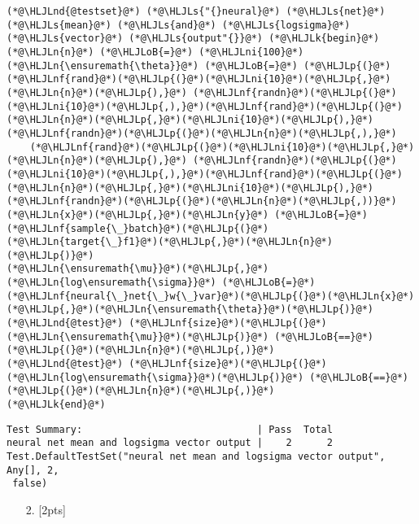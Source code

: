 \documentclass[12pt,a4paper]{article}
\newcommand{\HLJLk}[1]{\textcolor[RGB]{148,91,176}{\textbf{#1}}}
\newcommand{\HLJLn}[1]{#1}
\newcommand{\HLJLnd}[1]{\textcolor[RGB]{214,102,97}{#1}}
\newcommand{\HLJLnf}[1]{\textcolor[RGB]{66,102,213}{#1}}
\newcommand{\HLJLs}[1]{\textcolor[RGB]{201,61,57}{#1}}
\newcommand{\HLJLni}[1]{\textcolor[RGB]{59,151,46}{#1}}
\newcommand{\HLJLoB}[1]{\textcolor[RGB]{102,102,102}{\textbf{#1}}}
\newcommand{\HLJLp}[1]{#1}
\begin{document}
\begin{lstlisting}
(*@\HLJLnd{@testset}@*) (*@\HLJLs{"{}neural}@*) (*@\HLJLs{net}@*) (*@\HLJLs{mean}@*) (*@\HLJLs{and}@*) (*@\HLJLs{logsigma}@*) (*@\HLJLs{vector}@*) (*@\HLJLs{output"{}}@*) (*@\HLJLk{begin}@*)
(*@\HLJLn{n}@*) (*@\HLJLoB{=}@*) (*@\HLJLni{100}@*)
(*@\HLJLn{\ensuremath{\theta}}@*) (*@\HLJLoB{=}@*) (*@\HLJLp{(}@*)(*@\HLJLnf{rand}@*)(*@\HLJLp{(}@*)(*@\HLJLni{10}@*)(*@\HLJLp{,}@*)(*@\HLJLn{n}@*)(*@\HLJLp{),}@*) (*@\HLJLnf{randn}@*)(*@\HLJLp{(}@*)(*@\HLJLni{10}@*)(*@\HLJLp{,),}@*)(*@\HLJLnf{rand}@*)(*@\HLJLp{(}@*)(*@\HLJLn{n}@*)(*@\HLJLp{,}@*)(*@\HLJLni{10}@*)(*@\HLJLp{),}@*)(*@\HLJLnf{randn}@*)(*@\HLJLp{(}@*)(*@\HLJLn{n}@*)(*@\HLJLp{,),}@*)
    (*@\HLJLnf{rand}@*)(*@\HLJLp{(}@*)(*@\HLJLni{10}@*)(*@\HLJLp{,}@*)(*@\HLJLn{n}@*)(*@\HLJLp{),}@*) (*@\HLJLnf{randn}@*)(*@\HLJLp{(}@*)(*@\HLJLni{10}@*)(*@\HLJLp{,),}@*)(*@\HLJLnf{rand}@*)(*@\HLJLp{(}@*)(*@\HLJLn{n}@*)(*@\HLJLp{,}@*)(*@\HLJLni{10}@*)(*@\HLJLp{),}@*)(*@\HLJLnf{randn}@*)(*@\HLJLp{(}@*)(*@\HLJLn{n}@*)(*@\HLJLp{,))}@*)
(*@\HLJLn{x}@*)(*@\HLJLp{,}@*)(*@\HLJLn{y}@*) (*@\HLJLoB{=}@*) (*@\HLJLnf{sample{\_}batch}@*)(*@\HLJLp{(}@*)(*@\HLJLn{target{\_}f1}@*)(*@\HLJLp{,}@*)(*@\HLJLn{n}@*)(*@\HLJLp{)}@*)
(*@\HLJLn{\ensuremath{\mu}}@*)(*@\HLJLp{,}@*) (*@\HLJLn{log\ensuremath{\sigma}}@*) (*@\HLJLoB{=}@*) (*@\HLJLnf{neural{\_}net{\_}w{\_}var}@*)(*@\HLJLp{(}@*)(*@\HLJLn{x}@*)(*@\HLJLp{,}@*)(*@\HLJLn{\ensuremath{\theta}}@*)(*@\HLJLp{)}@*)
(*@\HLJLnd{@test}@*) (*@\HLJLnf{size}@*)(*@\HLJLp{(}@*)(*@\HLJLn{\ensuremath{\mu}}@*)(*@\HLJLp{)}@*) (*@\HLJLoB{==}@*) (*@\HLJLp{(}@*)(*@\HLJLn{n}@*)(*@\HLJLp{,)}@*)
(*@\HLJLnd{@test}@*) (*@\HLJLnf{size}@*)(*@\HLJLp{(}@*)(*@\HLJLn{log\ensuremath{\sigma}}@*)(*@\HLJLp{)}@*) (*@\HLJLoB{==}@*) (*@\HLJLp{(}@*)(*@\HLJLn{n}@*)(*@\HLJLp{,)}@*)
(*@\HLJLk{end}@*)
\end{lstlisting}

\begin{lstlisting}
Test Summary:                              | Pass  Total
neural net mean and logsigma vector output |    2      2
Test.DefaultTestSet("neural net mean and logsigma vector output", Any[], 2,
 false)
\end{lstlisting}


\begin{itemize}
\item[2. ] [2pts]

\end{itemize}
\end{document}
